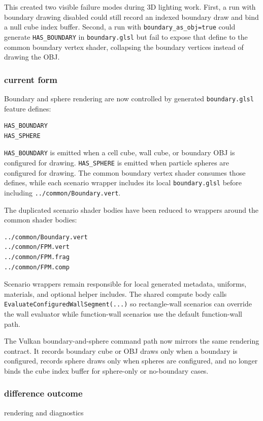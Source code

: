 This created two visible failure modes during 3D lighting work.  First, a
run with boundary drawing disabled could still record an indexed boundary
draw and bind a null cube index buffer.  Second, a run with
\texttt{boundary\_as\_obj=true} could generate \texttt{HAS\_BOUNDARY} in
\texttt{boundary.glsl} but fail to expose that define to the common boundary
vertex shader, collapsing the boundary vertices instead of drawing the OBJ.

\subsubsection{current form}

Boundary and sphere rendering are now controlled by generated
\texttt{boundary.glsl} feature defines:
\begin{verbatim}
HAS_BOUNDARY
HAS_SPHERE
\end{verbatim}
\texttt{HAS\_BOUNDARY} is emitted when a cell cube, wall cube, or boundary
OBJ is configured for drawing.  \texttt{HAS\_SPHERE} is emitted when
particle spheres are configured for drawing.  The common boundary vertex
shader consumes those defines, while each scenario wrapper includes its local
\texttt{boundary.glsl} before including \texttt{../common/Boundary.vert}.

The duplicated scenario shader bodies have been reduced to wrappers around
the common shader bodies:
\begin{verbatim}
../common/Boundary.vert
../common/FPM.vert
../common/FPM.frag
../common/FPM.comp
\end{verbatim}
Scenario wrappers remain responsible for local generated metadata, uniforms,
materials, and optional helper includes.  The shared compute body calls
\texttt{EvaluateConfiguredWallSegment(...)} so rectangle-wall scenarios can
override the wall evaluator while function-wall scenarios use the default
function-wall path.

The Vulkan boundary-and-sphere command path now mirrors the same rendering
contract.  It records boundary cube or OBJ draws only when a boundary is
configured, records sphere draws only when spheres are configured, and no
longer binds the cube index buffer for sphere-only or no-boundary cases.

\subsubsection{difference outcome}

rendering and diagnostics

